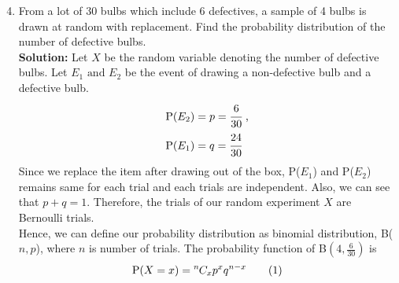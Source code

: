 \documentclass[journal,12pt,twocolumn]{IEEEtran}
\providecommand{\brak}[1]{\ensuremath{\left(#1\right)}}
\newcommand{\solution}{\noindent \textbf{Solution: }}
\newcommand*{\permcomb}[4][0mu]{{{}^{#3}\mkern#1#2_{#4}}}
\newcommand*{\comb}[1][-1mu]{\permcomb[#1]{C}}
\newcommand\numberthis{\addtocounter{equation}{1}\tag{\theequation}}
\newcommand\T{\rule{0pt}{2.6ex}}       %
\newcommand\B{\rule[-1.2ex]{0pt}{0pt}} %
\begin{document}
\begin{enumerate}[label=13.\arabic{enumi}.\arabic{enumii}]
\setcounter{enumi}{3}
\setcounter{enumii}{6}
\item From a lot of 30 bulbs which include 6 defectives, a sample of 4 bulbs is drawn at random with replacement. Find the probability distribution of the number of defective bulbs.\\
	\solution
		Let $X$ be the random variable denoting the number of defective bulbs. Let $E_1 \text{ and } E_2$ be the event of drawing a non-defective bulb and a defective bulb.
	\begin{align}
		\text{P}(E_2)&= p = \cfrac{6}{30}  \text{ ,} \\
		 \text{P}(E_1)&= q = \cfrac{24}{30}
	\end{align}
		Since we replace the item after drawing out of the box, P($E_1$) and P($E_2$) remains same for each trial and each trials are independent. Also, we can see that $p+q=1$. Therefore, the trials of our random experiment $X$ are Bernoulli trials. \\
		Hence, we can define our probability distribution as binomial distribution, B($n,p$), where $n$ is number of trials. The probability function of B$\brak{4,\frac{6}{30}}$ is \[\text{P($X=x$)}=\comb{n}{x}p^xq^{n-x} \numberthis \]

\end{enumerate}
\end{document}
